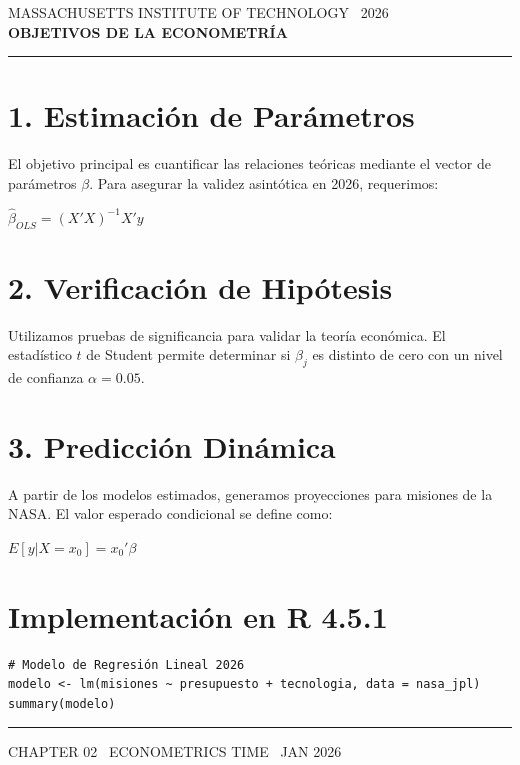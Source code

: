 \documentclass[10pt, spanish]{article}
\newcommand{\techfont}{\fontfamily{phv}\selectfont}
\newcommand{\eqbox}[1]{
    \begin{center}
        \begin{tcolorbox}[colback=white, colframe=Champagne, arc=0pt, boxrule=0.6pt, left=10pt, right=10pt, top=8pt, bottom=8pt]
            \centering $\displaystyle #1 $
        \end{tcolorbox}
    \end{center}
}
\begin{document}
\begin{center}
    {\techfont \fontsize{7}{8} \selectfont \color{gray} MASSACHUSETTS INSTITUTE OF TECHNOLOGY \textbar \ 2026} \\
    \vspace{5pt}
    {\Huge \textbf{OBJETIVOS DE LA ECONOMETRÍA}} \\
    \vspace{2pt}
    \textcolor{Champagne}{\rule{6cm}{0.5pt}}
\end{center}

\section*{1. Estimación de Parámetros}
El objetivo principal es cuantificar las relaciones teóricas mediante el vector de parámetros $\beta$. Para asegurar la validez asintótica en 2026, requerimos:

\eqbox{\hat{\beta}_{OLS} = (X'X)^{-1}X'y}

\section*{2. Verificación de Hipótesis}
Utilizamos pruebas de significancia para validar la teoría económica. El estadístico $t$ de Student permite determinar si $\beta_j$ es distinto de cero con un nivel de confianza $\alpha = 0.05$.

\section*{3. Predicción Dinámica}
A partir de los modelos estimados, generamos proyecciones para misiones de la NASA. El valor esperado condicional se define como:

\eqbox{E[y | X = x_0] = x_0' \beta}

\section*{Implementación en R 4.5.1}
\begin{tcolorbox}[colback=VogueBlack, colframe=VogueBlack, arc=3pt, title=\techfont \tiny R-CONSOLE: ESTIMACIÓN]
\begin{verbatim}
# Modelo de Regresión Lineal 2026
modelo <- lm(misiones ~ presupuesto + tecnologia, data = nasa_jpl)
summary(modelo)
\end{verbatim}
\end{tcolorbox}

\vfill
\hrule height 0.4pt
\begin{center}
    \tiny \techfont \textcolor{VogueBlack}{CHAPTER 02 \textbar \ ECONOMETRICS TIME \textbar \ JAN 2026}
\end{center}
\end{document}
